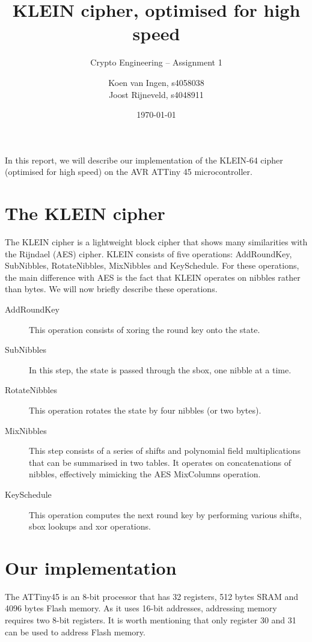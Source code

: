 \documentclass[a4paper]{article}
\title{KLEIN cipher, optimised for high speed}
\subtitle{Crypto Engineering -- Assignment 1}
\date{\monthdate\today}
\author{Koen van Ingen, s4058038\\
Joost Rijneveld, s4048911}
\begin{document}
\maketitle

In this report, we will describe our implementation of the KLEIN-64 cipher (optimised for high speed) on the AVR ATTiny 45 microcontroller.

\section{The KLEIN cipher}

The KLEIN cipher is a lightweight block cipher that shows many similarities with the Rijndael (AES) cipher. KLEIN consists of five operations: AddRoundKey, SubNibbles, RotateNibbles, MixNibbles and KeySchedule. For these operations, the main difference with AES is the fact that KLEIN operates on nibbles rather than bytes. We will now briefly describe these operations. 

\begin{description}
	\item[AddRoundKey] This operation consists of xoring the round key onto the state.
	\item[SubNibbles] In this step, the state is passed through the sbox, one nibble at a time. 
	\item[RotateNibbles] This operation rotates the state by four nibbles (or two bytes).
	\item[MixNibbles] This step consists of a series of shifts and polynomial field multiplications that can be summarised in two tables. It operates on concatenations of nibbles, effectively mimicking the AES MixColumns operation.
	\item[KeySchedule] This operation computes the next round key by performing various shifts, sbox lookups and xor operations.
\end{description}

\section{Our implementation}

The ATTiny45 is an 8-bit processor that has 32 registers, 512 bytes SRAM and 4096 bytes Flash memory. As it uses 16-bit addresses, addressing memory requires two 8-bit registers. It is worth mentioning that only register 30 and 31 can be used to address Flash memory.
\end{document}
